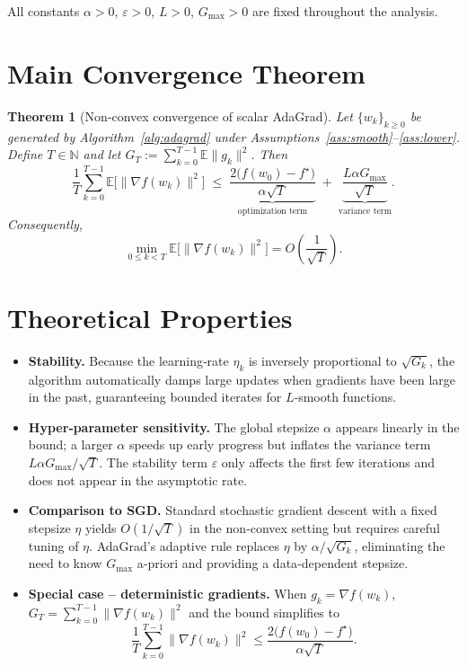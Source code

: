 \documentclass{article}
\newtheorem{theorem}{Theorem}
\begin{document}
All constants $\alpha>0$, $\varepsilon>0$, $L>0$, $G_{\max}>0$ are fixed throughout the analysis.

\section*{Main Convergence Theorem}
\begin{theorem}[Non‑convex convergence of scalar AdaGrad]\label{thm:main}
Let $\{w_k\}_{k\ge0}$ be generated by Algorithm~\ref{alg:adagrad} under
Assumptions~\ref{ass:smooth}–\ref{ass:lower}.  
Define $T\in\mathbb{N}$ and let $G_T:=\sum_{k=0}^{T-1}\mathbb{E}\|g_k\|^{2}$.
Then
\[
\frac{1}{T}\sum_{k=0}^{T-1}\mathbb{E}\big[\|\nabla f(w_k)\|^{2}\big]
\;\le\;
\underbrace{\frac{2\big(f(w_{0})-f^{\star}\big)}{\alpha\sqrt{T}}}_{\text{optimization term}}
\;+\;
\underbrace{\frac{L\alpha G_{\max}}{\sqrt{T}}}_{\text{variance term}} .
\]
Consequently,
\[
\min_{0\le k<T}\mathbb{E}\big[\|\nabla f(w_k)\|^{2}\big]
= O\!\left(\frac{1}{\sqrt{T}}\right).
\]
\end{theorem}

\section*{Theoretical Properties}
\begin{itemize}
\item \textbf{Stability.} Because the learning‑rate $\eta_k$ is inversely proportional to $\sqrt{G_k}$, the algorithm automatically damps large updates when gradients have been large in the past, guaranteeing bounded iterates for $L$‑smooth functions.
\item \textbf{Hyper‑parameter sensitivity.} The global stepsize $\alpha$ appears linearly in the bound; a larger $\alpha$ speeds up early progress but inflates the variance term $L\alpha G_{\max}/\sqrt{T}$. The stability term $\varepsilon$ only affects the first few iterations and does not appear in the asymptotic rate.
\item \textbf{Comparison to SGD.} Standard stochastic gradient descent with a fixed stepsize $\eta$ yields $O(1/\sqrt{T})$ in the non‑convex setting but requires careful tuning of $\eta$. AdaGrad’s adaptive rule replaces $\eta$ by $\alpha/\sqrt{G_k}$, eliminating the need to know $G_{\max}$ a‑priori and providing a data‑dependent stepsize.
\item \textbf{Special case – deterministic gradients.} When $g_k=\nabla f(w_k)$, $G_T=\sum_{k=0}^{T-1}\|\nabla f(w_k)\|^{2}$ and the bound simplifies to 
\[
\frac{1}{T}\sum_{k=0}^{T-1}\|\nabla f(w_k)\|^{2}
\le \frac{2\big(f(w_{0})-f^{\star}\big)}{\alpha\sqrt{T}} .
\]
\end{itemize}
\end{document}
